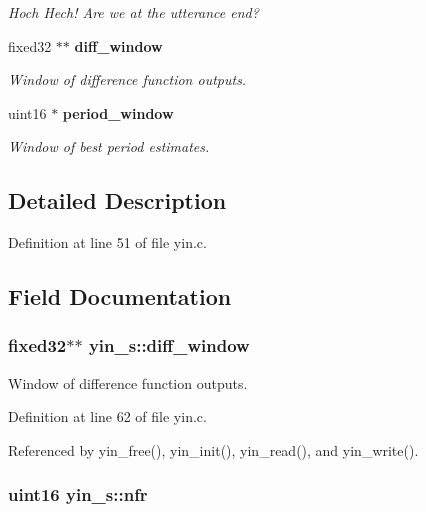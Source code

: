 \begin{DoxyCompactItemize}
\begin{DoxyCompactList}\small\item\em Hoch Hech! Are we at the utterance end? \end{DoxyCompactList}\item 
fixed32 $\ast$$\ast$ {\bf diff\-\_\-window}
\begin{DoxyCompactList}\small\item\em Window of difference function outputs. \end{DoxyCompactList}\item 
uint16 $\ast$ {\bf period\-\_\-window}
\begin{DoxyCompactList}\small\item\em Window of best period estimates. \end{DoxyCompactList}\end{DoxyCompactItemize}


\subsection{Detailed Description}


Definition at line 51 of file yin.\-c.



\subsection{Field Documentation}
\subsubsection[{diff\-\_\-window}]{\setlength{\rightskip}{0pt plus 5cm}fixed32$\ast$$\ast$ yin\-\_\-s\-::diff\-\_\-window}\label{structyin__s_a932e8441ff0aa6b9b37f5055c97a4d11}


Window of difference function outputs. 



Definition at line 62 of file yin.\-c.



Referenced by yin\-\_\-free(), yin\-\_\-init(), yin\-\_\-read(), and yin\-\_\-write().

\subsubsection[{nfr}]{\setlength{\rightskip}{0pt plus 5cm}uint16 yin\-\_\-s\-::nfr}\label{structyin__s_af4f11d14a36bbdc19863fa8335237423}


